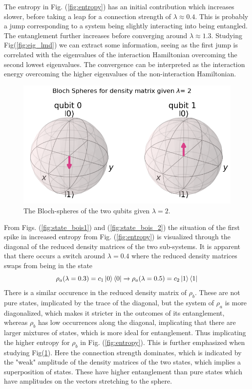 The entropy in Fig. (\ref{fig:entropy}) has an initial contribution which increases slower, before taking a leap for a connection strength of $\lambda \approx 0.4$. This is probably a jump corresponding to a system being slightly interacting into being entangled. The entanglement further increases before converging around $\lambda \approx 1.3$. Studying Fig(\ref{fig:eig_lmd}) we can extract some information, seeing as the first jump is correlated with the eigenvalues of the interaction Hamiltonian overcoming the second lowest eigenvalues. The convergence can be interpreted as the interaction energy overcoming the higher eigenvalues of the non-interaction Hamiltonian.
\newline\newline
\begin{figure}
    \centering
    \includegraphics[width=\linewidth]{figs/bloch_entropy_lmd_2.PNG}
    \caption{The Bloch-spheres of the two qubits given $\lambda = 2$. }
    \label{fig:bloch_entropy}
\end{figure}
From Figs. (\ref{fig:state_bois1}) and (\ref{fig:state_bois_2}) the situation of the first spike in increased entropy from Fig. (\ref{fig:entropy}) is visualized through the diagonal of the reduced density matrices of the two sub-systems. It is apparent that there occurs a switch around $\lambda = 0.4$ where the reduced density matrices swaps from being in the state $$\rho_a(\lambda = 0.3) = c_1 \ket{0}\bra{0} \xrightarrow{} \rho_a(\lambda = 0.5) = c_2 \ket{1}\bra{1}$$
There is a similar occurence in the reduced density matrix  of $\rho_b$. These are not pure states, implicated by the trace of the diagonal, but the system of $\rho_a$ is more diagonalized, which makes it stricter in the outcomes of its entanglement, whereas $\rho_b$ has low occurrences along the diagonal, implicating that there are larger mixtures of states, which is more ideal for entanglement. Thus implicating the higher entropy for $\rho_b$ in Fig. (\ref{fig:entropy}). This is further emphasized when studying Fig(\ref{fig:bloch_entropy}). Here the connection strength dominates, which is indicated by the "weak" amplitude of the density matrices of the two states, which implies a superposition of states. These have higher entanglement than pure states which have amplitudes on the vectors stretching to the sphere. \newline\newline



